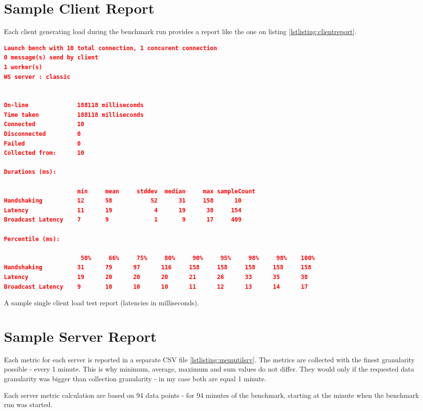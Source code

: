\documentclass{uvamscse}
\begin{document}
\section{Sample Client Report}\label{Client Report}
Each client generating load during the benchmark run provides a report like the one on listing \ref{lstlisting:clientreport}.

\begin{sourcecode}[H]
\begin{lstlisting}[language=json]
Launch bench with 10 total connection, 1 concurent connection
0 message(s) send by client
1 worker(s)
WS server : classic


On-line              188118 milliseconds
Time taken           188118 milliseconds
Connected            10
Disconnected         0
Failed               0
Collected from:      10

Durations (ms):

                     min     mean     stddev  median     max sampleCount
Handshaking          12      58           52      31     158      10
Latency              11      19            4      19      38     154
Broadcast Latency    7       9             1       9      17     409

Percentile (ms):

                      50%     66%     75%     80%     90%     95%     98%     98%    100%
Handshaking          31      79      97      116     158     158     158     158     158
Latency              19      20      20      20      21      26      33      35      38
Broadcast Latency    9       10      10      10      11      12      13      14      17
\end{lstlisting}
\caption{A sample single client load test report (latencies in milliseconds).}
\label{lstlisting:clientreport}
\end{sourcecode}

\section{Sample Server Report}
Each metric for each server is reported in a separate CSV file \ref{lstlisting:memutilsrv}. The metrics are collected with the finest granularity possible - every 1 minute. This is why minimum, average, maximum and sum values do not differ. They would only if the requested data granularity was bigger than collection granularity - in my case both are equal 1 minute.

Each server metric calculation are based on 94 data points - for 94 minutes of the benchmark, starting at the minute when the benchmark run was started.
\end{document}
